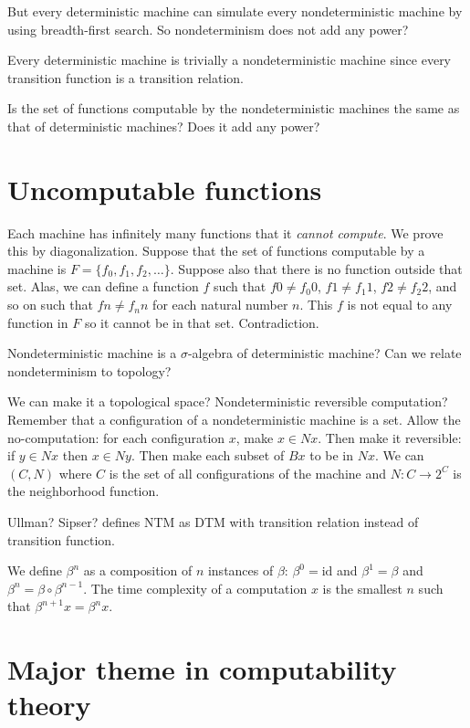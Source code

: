 But every deterministic machine can simulate
every nondeterministic machine by using breadth-first search.
So nondeterminism does not add any power?

Every deterministic machine is trivially a
nondeterministic machine since every transition function is a transition relation.

Is the set of functions computable by the nondeterministic machines
the same as that of deterministic machines?
Does it add any power?

\section{Uncomputable functions}

Each machine has infinitely many functions that it \emph{cannot compute}.
We prove this by diagonalization.
Suppose that the set of functions computable by a machine is $F = \{ f_0, f_1, f_2, \ldots \}$.
Suppose also that there is no function outside that set.
Alas, we can define a function $f$
such that $f0 \neq f_0 0$, $f1 \neq f_1 1$, $f2 \neq f_2 2$, and so on
such that $fn \neq f_n n$ for each natural number $n$.
This $f$ is not equal to any function in $F$ so it cannot be in that set.
Contradiction.

Nondeterministic machine is a $\sigma$-algebra of deterministic machine?
Can we relate nondeterminism to topology?

We can make it a topological space?
Nondeterministic reversible computation?
Remember that a configuration of a nondeterministic machine is a set.
Allow the no-computation: for each configuration $x$, make $x \in N x$.
Then make it reversible:
if $y \in N x$ then $x \in N y$.
Then make each subset of $B x$ to be in $N x$.
We can $(C,N)$ where $C$ is the set of all configurations of the machine
and $N : C \to 2^C$ is the neighborhood function.

Ullman? Sipser? defines NTM as DTM with transition relation instead of transition function.

We define $\beta^n$ as a composition of $n$ instances of $\beta$:
$\beta^0 = \text{id}$ and $\beta^1 = \beta$ and $\beta^n = \beta \circ \beta^{n-1}$.
The time complexity of a computation $x$
is the smallest $n$ such that $\beta^{n+1} x = \beta^n x$.

\section{Major theme in computability theory}

